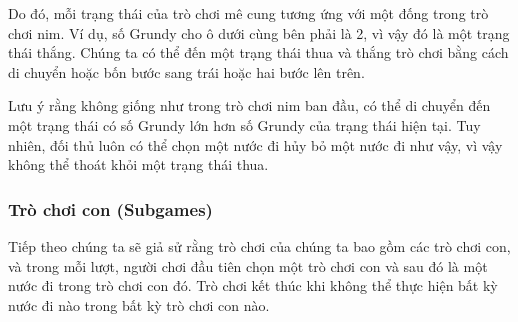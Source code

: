 \begin{center}
\end{center}

Do đó, mỗi trạng thái của trò chơi mê cung
tương ứng với một đống trong trò chơi nim.
Ví dụ, số Grundy cho
ô dưới cùng bên phải là 2,
vì vậy đó là một trạng thái thắng.
Chúng ta có thể đến một trạng thái thua và
thắng trò chơi bằng cách di chuyển
hoặc bốn bước sang trái hoặc
hai bước lên trên.

Lưu ý rằng không giống như trong trò chơi nim ban đầu,
có thể di chuyển đến một trạng thái có
số Grundy lớn hơn số Grundy
của trạng thái hiện tại.
Tuy nhiên, đối thủ luôn có thể chọn một nước đi
hủy bỏ một nước đi như vậy, vì vậy không thể
thoát khỏi một trạng thái thua.

\subsubsection{Trò chơi con (Subgames)}

Tiếp theo chúng ta sẽ giả sử rằng trò chơi của chúng ta bao gồm
các trò chơi con, và trong mỗi lượt, người chơi
đầu tiên chọn một trò chơi con và sau đó là một nước đi trong trò chơi con đó.
Trò chơi kết thúc khi không thể thực hiện bất kỳ nước đi nào
trong bất kỳ trò chơi con nào.

